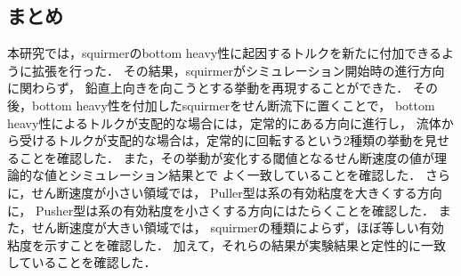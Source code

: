 \subsection{まとめ}
本研究では，squirmerのbottom heavy性に起因するトルクを新たに付加できるように拡張を行った．
その結果，squirmerがシミュレーション開始時の進行方向に関わらず，
鉛直上向きを向こうとする挙動を再現することができた．
その後，bottom heavy性を付加したsquirmerをせん断流下に置くことで，
bottom heavy性によるトルクが支配的な場合には，定常的にある方向に進行し，
流体から受けるトルクが支配的な場合は，定常的に回転するという2種類の挙動を見せることを確認した．
また，その挙動が変化する閾値となるせん断速度の値が理論的な値とシミュレーション結果とで
よく一致していることを確認した．
さらに，せん断速度が小さい領域では，
Puller型は系の有効粘度を大きくする方向に，
Pusher型は系の有効粘度を小さくする方向にはたらくことを確認した．
また，せん断速度が大きい領域では，
squirmerの種類によらず，ほぼ等しい有効粘度を示すことを確認した．
加えて，それらの結果が実験結果と定性的に一致していることを確認した．
